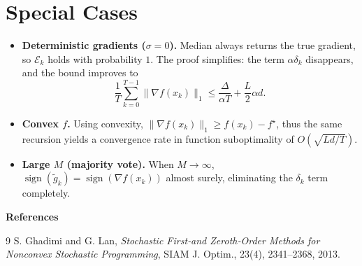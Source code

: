 \documentclass{article}
\newcommand{\sign}{\operatorname{sign}}
\begin{document}
\section*{Special Cases}
\begin{itemize}
\item \textbf{Deterministic gradients ($\sigma=0$).}  Median always returns the true gradient, so $\mathcal{E}_k$ holds with probability $1$.  The proof simplifies: the term $\alpha\delta_k$ disappears, and the bound improves to
\[
\frac{1}{T}\sum_{k=0}^{T-1}\|\nabla f(x_k)\|_{1}
\le \frac{\Delta}{\alpha T}+ \frac{L}{2}\alpha d.
\]
\item \textbf{Convex $f$.}  Using convexity, $ \|\nabla f(x_k)\|_{1}\ge f(x_k)-f^{\star}$, thus the same recursion yields a convergence rate in function suboptimality of $O(\sqrt{Ld/T})$.
\item \textbf{Large $M$ (majority vote).}  When $M\to\infty$, $\sign(\tilde{g}_k)=\sign(\nabla f(x_k))$ almost surely, eliminating the $\delta_k$ term completely.
\end{itemize}

\bigskip
\noindent\textbf{References}
\begin{thebibliography}{9}
S. Ghadimi and G. Lan, \emph{Stochastic First‑and Zeroth‑Order Methods for Nonconvex Stochastic Programming}, SIAM J. Optim., 23(4), 2341–2368, 2013.
\end{thebibliography}
\end{document}
